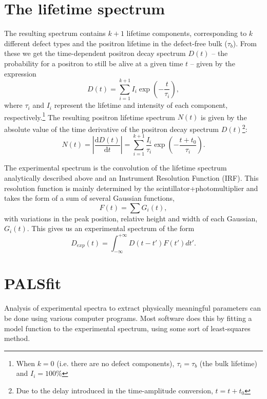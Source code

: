 \section{The lifetime spectrum}

The resulting spectrum contains $k+1$ lifetime components, corresponding to $k$ different defect types and the positron lifetime in the defect-free bulk ($\tau_b$). From these we get the time-dependent positron decay spectrum $D(t)$ -- the probability for a positron to still be alive at a given time $t$ \cite{EFermi} -- given by the expression
\begin{equation}
    D(t) = \sum_{i=1}^{k+1}I_i\exp\left(-\frac{t}{\tau_i}\right),
    \label{eq:decayspec}
\end{equation}
where $\tau_i$ and $I_i$ represent the lifetime and intensity of each component, respectively.\footnote{When $k=0$ (i.e. there are no defect components), $\tau_i = \tau_b$ (the bulk lifetime) and $I_i = 100\%$} The resulting positron lifetime spectrum $N(t)$ is given by the absolute value of the time derivative of the positron decay spectrum $D(t)$\footnote{Due to the delay introduced in the time-amplitude conversion, $t = t + t_0$}:
\begin{equation}
    N(t) = \left|\frac{\mathrm{d}D(t)}{\mathrm{d}t}\right| = \sum_{i=1}^{k+1}\frac{I_i}{\tau_i}\exp\left(-\frac{t + t_0}{\tau_i}\right).
    \label{eq:lifespec}
\end{equation}

The experimental spectrum is the convolution of the lifetime spectrum analytically described above and an Instrument Resolution Function (IRF). This resolution function is mainly determined by the scintillator+photomultiplier and takes the form of a sum of several Gaussian functions, 
\begin{equation}
    F(t) = \sum G_i(t),
\end{equation}
with variations in the peak position, relative height and width of each Gaussian, $G_i(t)$. This gives us an experimental spectrum of the form
\begin{equation}
    D_{exp} (t) = \int_{-\infty}^{+\infty} D(t-t') F(t') dt'.
\end{equation}

\section{PALSfit}

Analysis of experimental spectra to extract physically meaningful parameters can be done using various computer programs. Most software does this by fitting a model function to the experimental spectrum, using some sort of least-squares method. 

